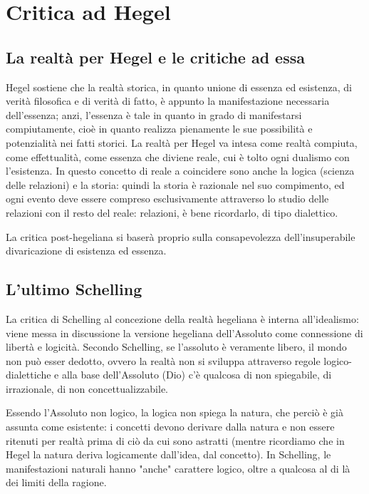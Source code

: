 \chapter{Critica ad Hegel}
\bigskip
\section{La realtà per Hegel e le critiche ad essa}

Hegel sostiene che la realtà storica, in quanto unione di essenza ed esistenza, di verità filosofica e di verità di fatto, è appunto la manifestazione necessaria dell'essenza; anzi, l'essenza è tale in quanto in grado di manifestarsi compiutamente, cioè in quanto realizza pienamente le sue possibilità e potenzialità nei fatti storici. La realtà per Hegel va intesa come realtà compiuta, come effettualità, come essenza che diviene reale, cui è tolto ogni dualismo con l'esistenza. In questo concetto di reale a coincidere sono anche la logica (scienza delle relazioni) e la storia: quindi la storia è razionale nel suo compimento, ed ogni evento deve essere compreso esclusivamente attraverso lo studio delle relazioni con il resto del reale: relazioni, è bene ricordarlo,  di tipo dialettico.

La critica post-hegeliana si baserà proprio sulla consapevolezza dell'insuperabile divaricazione di esistenza ed essenza.

\section{L'ultimo Schelling}

La critica di Schelling al concezione della realtà hegeliana è interna all'idealismo: viene messa in discussione la versione hegeliana dell'Assoluto come connessione di libertà e logicità. Secondo Schelling, se l'assoluto è veramente libero, il mondo non può esser dedotto, ovvero la realtà non si sviluppa attraverso regole logico-dialettiche  e alla base dell'Assoluto (Dio) c'è qualcosa di non spiegabile, di irrazionale, di non concettualizzabile.

Essendo l'Assoluto non logico, la logica non spiega la natura, che perciò è già assunta come esistente: i concetti devono derivare dalla natura e non essere ritenuti per realtà prima di ciò da cui sono astratti (mentre ricordiamo che in Hegel la natura deriva logicamente dall'idea, dal concetto). In Schelling, le manifestazioni naturali hanno "anche" carattere logico, oltre a qualcosa al di là dei limiti della ragione.

